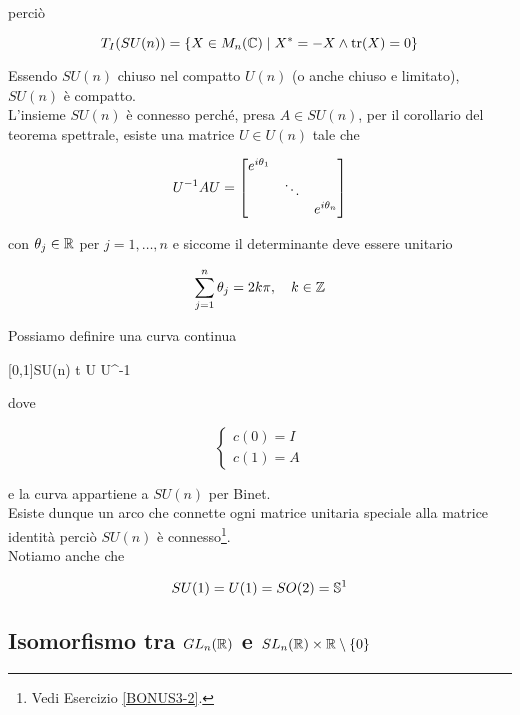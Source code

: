 perciò

\begin{equation}
	T_{I}(SU(n)) = \{ X \in M_{n}(\C) \mid X^{*} = -X \wedge \tr(X) = 0 \}
\end{equation}

Essendo $ SU(n) $ chiuso nel compatto $ U(n) $ (o anche chiuso e limitato), $ SU(n) $ è compatto.\\
L'insieme $ SU(n) $ è connesso perché, presa $ A \in SU(n) $, per il corollario del teorema spettrale, esiste una matrice $ U \in U(n) $ tale che

\begin{equation}
	U^{-1} A U = %
	\bmqty{ %
			\dmat{ %
			 		e^{i \theta_{1}}, %
			 		\ddots, %
			 		e^{i \theta_{n}} %
		 			} %
	 		}
\end{equation}

con $ \theta_{j} \in \R $ per $ j=1,\dots,n $ e siccome il determinante deve essere unitario

\begin{equation}
	\sum_{j=1}^{n} \theta_{j} = 2 k \pi \qcomma k \in \Z
\end{equation}

Possiamo definire una curva continua

	{[0,1]}{SU(n)}
	{t}{ %
			U  U^{-1} %
			}

dove

\begin{equation}
	\begin{cases}
		c(0) = I \\
		c(1) = A
	\end{cases}
\end{equation}

e la curva appartiene a $ SU(n) $ per Binet.\\
Esiste dunque un arco che connette ogni matrice unitaria speciale alla matrice identità perciò $ SU(n) $ è connesso\footnote{%
	Vedi Esercizio \ref{BONUS3-2}.%
}.\\
Notiamo anche che

\begin{equation}
	SU(1) = U(1) = SO(2) = \S^{1}
\end{equation}

\subsection{Isomorfismo tra $ GL_{n}(\R) $ e $ SL_{n}(\R) \times \R \setminus \{0\} $}

